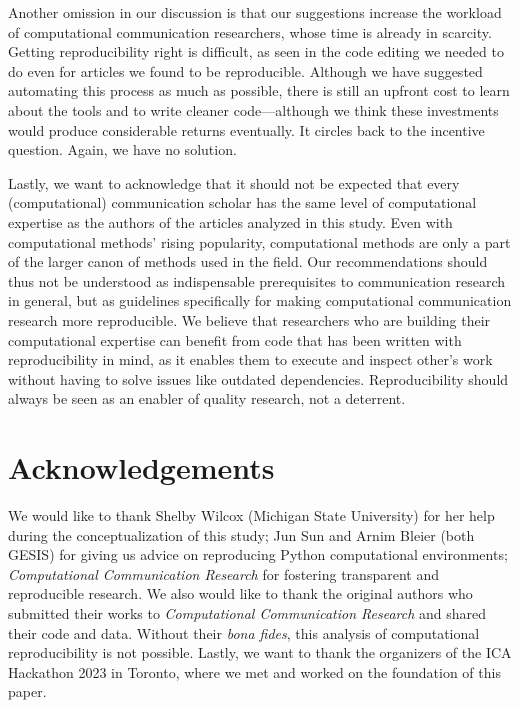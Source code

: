 Another omission in our discussion is that our suggestions increase the workload of computational communication researchers, whose time is already in scarcity. Getting reproducibility right is difficult, as seen in the code editing we needed to do even for articles we found to be reproducible. Although we have suggested automating this process as much as possible, there is still an upfront cost to learn about the tools and to write cleaner code---although we think these investments would produce considerable returns eventually. It circles back to the incentive question. Again, we have no solution.

Lastly, we want to acknowledge that it should not be expected that every (computational) communication scholar has the same level of computational expertise as the authors of the articles analyzed in this study. Even with computational methods' rising popularity, computational methods are only a part of the larger canon of methods used in the field. Our recommendations should thus not be understood as indispensable prerequisites to communication research in general, but as guidelines specifically for making computational communication research more reproducible. We believe that researchers who are building their computational expertise can benefit from code that has been written with reproducibility in mind, as it enables them to execute and inspect other's work without having to solve issues like outdated dependencies. Reproducibility should always be seen as an enabler of quality research, not a deterrent.

\section{Acknowledgements}

We would like to thank Shelby Wilcox (Michigan State University) for her help during the conceptualization of this study; Jun Sun and Arnim Bleier (both GESIS) for giving us advice on reproducing Python computational environments; 
\textit{Computational Communication Research} for fostering transparent and reproducible research. We also would like to thank the original authors who submitted their works to \textit{Computational Communication Research} and shared their code and data. Without their \textit{bona fides}, this analysis of computational reproducibility is not possible. Lastly, we want to thank the organizers of the ICA Hackathon 2023 in Toronto, where we met and worked on the foundation of this paper.
